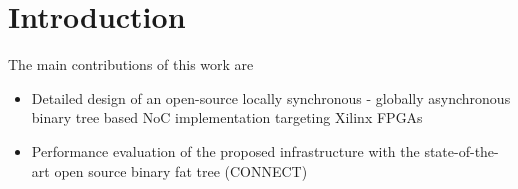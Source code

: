 \section{Introduction}
The main contributions of this work are
\begin{itemize}
\item Detailed design of an open-source locally synchronous - globally asynchronous binary tree based NoC implementation targeting Xilinx FPGAs
\item Performance evaluation of the proposed infrastructure with the state-of-the-art open source binary fat tree (CONNECT)
\end{itemize}
